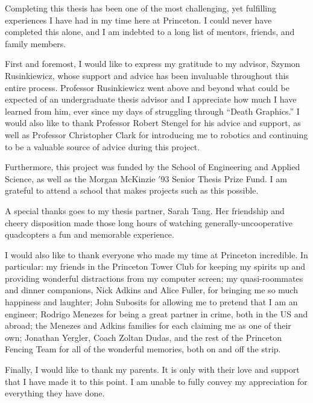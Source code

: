 Completing this thesis has been one of the most challenging, yet fulfilling experiences I have had in my time here at Princeton. I could never have completed this alone, and I am indebted to a long list of mentors, friends, and family members.

First and foremost, I would like to express my gratitude to my advisor, Szymon Rusinkiewicz, whose support and advice has been invaluable throughout this entire process. Professor Rusinkiewicz went above and beyond what could be expected of an undergraduate thesis advisor and I appreciate how much I have learned from him, ever since my days of struggling through ``Death Graphics.'' I would also like to thank Professor Robert Stengel for his advice and support, as well as Professor Christopher Clark for introducing me to robotics and continuing to be a valuable source of advice during this project.

Furthermore, this project was funded by the School of Engineering and Applied Science, as well as the Morgan McKinzie $'$93 Senior Thesis Prize Fund. I am grateful to attend a school that makes projects such as this possible.

A special thanks goes to my thesis partner, Sarah Tang. Her friendship and cheery disposition made those long hours of watching generally-uncooperative quadcopters a fun and memorable experience.

I would also like to thank everyone who made my time at Princeton incredible. In particular: my friends in the Princeton Tower Club for keeping my spirits up and providing wonderful distractions from my computer screen; my quasi-roommates and dinner companions, Nick Adkins and Alice Fuller, for bringing me so much happiness and laughter; John Subosits for allowing me to pretend that I am an engineer; Rodrigo Menezes for being a great partner in crime, both in the US and abroad; the Menezes and Adkins families for each claiming me as one of their own; Jonathan Yergler, Coach Zoltan Dudas, and the rest of the Princeton Fencing Team for all of the wonderful memories, both on and off the strip.

Finally, I would like to thank my parents. It is only with their love and support that I have made it to this point. I am unable to fully convey my appreciation for everything they have done.

